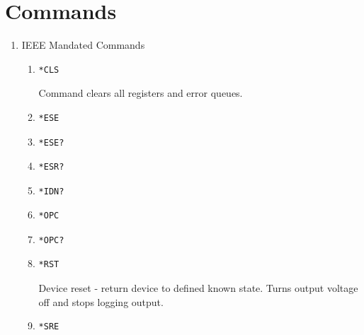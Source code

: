 \documentclass[a4paper,10pt]{article}
\begin{document}
\section{Commands}

\begin{enumerate}
\item IEEE Mandated Commands
    \begin{enumerate}
        \item \hypertarget{cls}{} 
            \begin{verbatim}*CLS\end{verbatim}
            \begin{description}
                Command clears all registers and error queues.
            \end{description}
        \item \begin{verbatim}*ESE\end{verbatim}
		\item \begin{verbatim}*ESE?\end{verbatim}
		\item \begin{verbatim}*ESR?\end{verbatim}
		\item \begin{verbatim}*IDN?\end{verbatim}
		\item \begin{verbatim}*OPC\end{verbatim}
		\item \begin{verbatim}*OPC?\end{verbatim}
        \item \begin{verbatim}*RST\end{verbatim}
            \begin{description}
                Device reset - return device to defined known state. Turns output voltage off and stops logging output.
            \end{description}
        \item \begin{verbatim}*SRE\end{verbatim}

\end{enumerate}
\end{enumerate}
\end{document}

